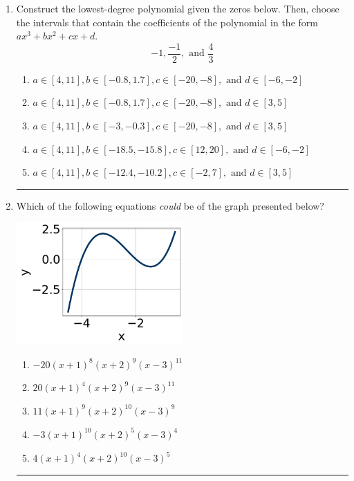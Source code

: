 \documentclass[14pt]{extbook}
\newcommand{\litem}[1]{\item#1\hspace*{-1cm}\rule{\textwidth}{0.4pt}}
\begin{document}
\begin{enumerate}
{\begin{enumerate}[label=\Alph*.]
\end{enumerate} }
\litem{
Construct the lowest-degree polynomial given the zeros below. Then, choose the intervals that contain the coefficients of the polynomial in the form $ax^3+bx^2+cx+d$.\[ -1, \frac{-1}{2}, \text{ and } \frac{4}{3} \]\begin{enumerate}[label=\Alph*.]
\item \( a \in [4, 11], b \in [-0.8, 1.7], c \in [-20, -8], \text{ and } d \in [-6, -2] \)
\item \( a \in [4, 11], b \in [-0.8, 1.7], c \in [-20, -8], \text{ and } d \in [3, 5] \)
\item \( a \in [4, 11], b \in [-3, -0.3], c \in [-20, -8], \text{ and } d \in [3, 5] \)
\item \( a \in [4, 11], b \in [-18.5, -15.8], c \in [12, 20], \text{ and } d \in [-6, -2] \)
\item \( a \in [4, 11], b \in [-12.4, -10.2], c \in [-2, 7], \text{ and } d \in [3, 5] \)

\end{enumerate} }
\litem{
Which of the following equations \textit{could} be of the graph presented below?
\begin{center}
    \includegraphics[width=0.5\textwidth]{../Figures/polyGraphToFunctionA.png}
\end{center}
\begin{enumerate}[label=\Alph*.]
\item \( -20(x + 1)^{8} (x + 2)^{9} (x - 3)^{11} \)
\item \( 20(x + 1)^{4} (x + 2)^{9} (x - 3)^{11} \)
\item \( 11(x + 1)^{9} (x + 2)^{10} (x - 3)^{9} \)
\item \( -3(x + 1)^{10} (x + 2)^{5} (x - 3)^{4} \)
\item \( 4(x + 1)^{4} (x + 2)^{10} (x - 3)^{5} \)

\end{enumerate} }
\end{enumerate}
\end{document}
